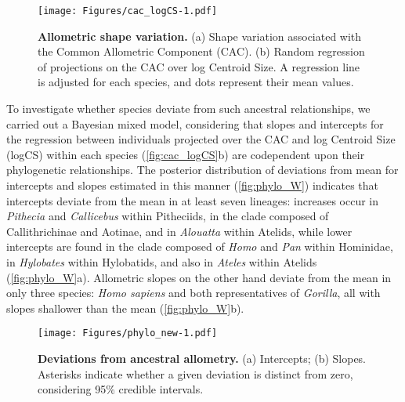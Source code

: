 \documentclass[12pt,twoside]{report}
\begin{document}
\begin{figure}[htbp]
\centering
\texttt{[image: Figures/cac\_logCS-1.pdf]}
\caption{\textbf{Allometric shape variation.} (a) Shape variation
associated with the Common Allometric Component (CAC). (b) Random
regression of projections on the CAC over log Centroid Size. A
regression line is adjusted for each species, and dots represent their
mean values. \label{fig:cac_logCS}}
\end{figure}

To investigate whether species deviate from such ancestral
relationships, we carried out a Bayesian mixed model, considering that
slopes and intercepts for the regression between individuals projected
over the CAC and log Centroid Size (logCS) within each species
(\autoref{fig:cac_logCS}b) are codependent upon their phylogenetic
relationships. The posterior distribution of deviations from mean for
intercepts and slopes estimated in this manner (\autoref{fig:phylo_W})
indicates that intercepts deviate from the mean in at least seven
lineages: increases occur in \emph{Pithecia} and \emph{Callicebus}
within Pitheciids, in the clade composed of Callithrichinae and Aotinae,
and in \emph{Alouatta} within Atelids, while lower intercepts are found
in the clade composed of \emph{Homo} and \emph{Pan} within Hominidae, in
\emph{Hylobates} within Hylobatids, and also in \emph{Ateles} within
Atelids (\autoref{fig:phylo_W}a). Allometric slopes on the other hand
deviate from the mean in only three species: \emph{Homo sapiens} and
both representatives of \emph{Gorilla}, all with slopes shallower than
the mean (\autoref{fig:phylo_W}b).

\begin{figure}[htbp]
\centering
\texttt{[image: Figures/phylo\_new-1.pdf]}
\caption{\textbf{Deviations from ancestral allometry.} (a) Intercepts;
(b) Slopes. Asterisks indicate whether a given deviation is distinct
from zero, considering 95\% credible intervals. \label{fig:phylo_W}}
\end{figure}
\end{document}
